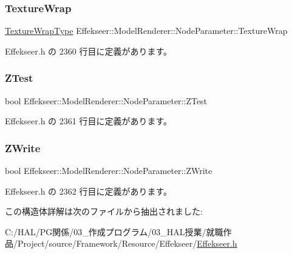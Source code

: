 \subsubsection{\texorpdfstring{Texture\+Wrap}{TextureWrap}}
{\footnotesize\ttfamily \mbox{\hyperlink{namespace_effekseer_a5320c83784602974b6278bf1a77b58a3}{Texture\+Wrap\+Type}} Effekseer\+::\+Model\+Renderer\+::\+Node\+Parameter\+::\+Texture\+Wrap}



 Effekseer.\+h の 2360 行目に定義があります。

\mbox{\label{struct_effekseer_1_1_model_renderer_1_1_node_parameter_a1618ec9d6054c1ab4e7ae3d6aba0c1ea}} 
\subsubsection{\texorpdfstring{Z\+Test}{ZTest}}
{\footnotesize\ttfamily bool Effekseer\+::\+Model\+Renderer\+::\+Node\+Parameter\+::\+Z\+Test}



 Effekseer.\+h の 2361 行目に定義があります。

\mbox{\label{struct_effekseer_1_1_model_renderer_1_1_node_parameter_ad7dee83188011c4dea4313ef0cf21570}} 
\subsubsection{\texorpdfstring{Z\+Write}{ZWrite}}
{\footnotesize\ttfamily bool Effekseer\+::\+Model\+Renderer\+::\+Node\+Parameter\+::\+Z\+Write}



 Effekseer.\+h の 2362 行目に定義があります。



この構造体詳解は次のファイルから抽出されました\+:\begin{DoxyCompactItemize}
\item 
C\+:/\+H\+A\+L/\+P\+G関係/03\+\_\+作成プログラム/03\+\_\+\+H\+A\+L授業/就職作品/\+Project/source/\+Framework/\+Resource/\+Effekseer/\mbox{\hyperlink{_effekseer_8h}{Effekseer.\+h}}\end{DoxyCompactItemize}
